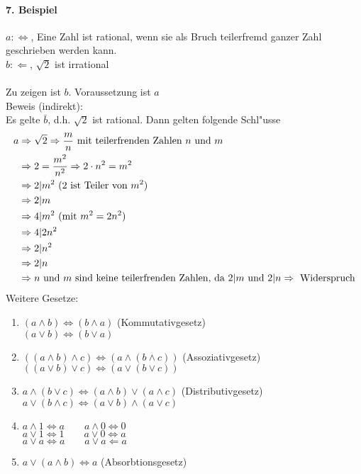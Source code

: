 \paragraph{7. Beispiel} $a:\Leftrightarrow$, Eine Zahl ist rational, wenn sie als Bruch teilerfremd ganzer Zahl geschrieben werden kann.\\
$b:\Leftarrow$, $\sqrt{2}$ ist irrational\\
\\
Zu zeigen ist $b$. Voraussetzung ist $a$\\
Beweis (indirekt):\\
Es gelte $\bar b$, d.h. $\sqrt{2}$ ist rational. Dann gelten folgende Schl"usse
\begin{align*}
	a&\Rightarrow\sqrt{2}\Rightarrow\frac{m}{n}\text{ mit teilerfrenden Zahlen }n\text{ und }m\\
	&\Rightarrow2=\frac{m^2}{n^2}\Rightarrow2\cdot n^2=m^2\\
	&\Rightarrow2|m^2\text{ (}2\text{ ist Teiler von }m^2\text{)}\\
	&\Rightarrow2|m\\
	&\Rightarrow4|m^2\text{ (mit }m^2=2n^2\text{)}\\
	&\Rightarrow4|2n^2\\
	&\Rightarrow2|n^2\\
	&\Rightarrow2|n\\
	&\Rightarrow n\text{ und }m\text{ sind keine teilerfrenden Zahlen, da }2|m\text{ und }2|n\Rightarrow\text{ Widerspruch}
\end{align*}
Weitere Gesetze:
\begin{enumerate}[label=\alph*)]
	\item $(a\land b)\Leftrightarrow(b\land a)$ (Kommutativgesetz)\\
	$(a\lor b)\Leftrightarrow(b\lor a)$
	\item $((a\land b)\land c)\Leftrightarrow(a\land(b\land c))$ (Assoziativgesetz)\\
	$((a\lor b)\lor c)\Leftrightarrow(a\lor(b\lor c))$
	\item $a\land(b\lor c)\Leftrightarrow(a\land b)\lor(a\land c)$ (Distributivgesetz)\\
	$a\lor(b\land c)\Leftrightarrow(a\lor b)\land(a\lor c)$
	\item $a\land1\Leftrightarrow a\qquad a\land0\Leftrightarrow0$\\
	$a\lor1\Leftrightarrow1\qquad a\lor0\Leftrightarrow a$\\
	$a\lor a\Leftrightarrow a\qquad a\lor a\Leftarrow a$
	\item $a\lor(a\land b)\Leftrightarrow a$ (Absorbtionsgesetz)
\end{enumerate}

